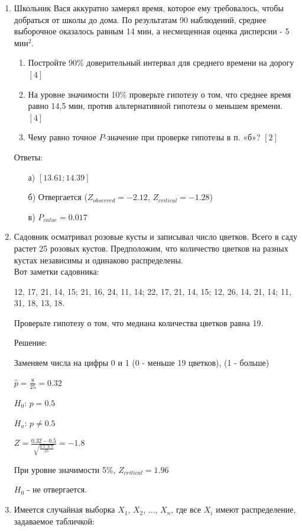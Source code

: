 \documentclass[12pt, a4paper]{article}\usepackage[]{graphicx}\usepackage[]{color}
\begin{document}
\begin{enumerate}
\item Школьник Вася аккуратно замерял время, которое ему требовалось, чтобы добраться от школы до дома. По результатам 90 наблюдений, среднее выборочное оказалось равным 14 мин, а несмещенная оценка дисперсии - 5 мин$^{2}$.
\begin{enumerate}
\item Постройте 90\% доверительный интервал для среднего времени на дорогу $[4]$
\item На уровне значимости 10\% проверьте гипотезу о том, что среднее время равно 14,5 мин, против альтернативной гипотезы о меньшем времени. $[4]$
\item Чему равно точное $P$-значение при проверке гипотезы в п. «б»? $[2]$
\end{enumerate}
Ответы:
\begin{enumerate}
\item[а)] $[13.61;14.39]$
\item[б)]  Отвергается ($Z_{observed}=-2.12$, $Z_{critical}=-1.28$)
\item[в)] $P_{value}=0.017$
\end{enumerate}

\item Садовник осматривал розовые кусты и записывал число цветков. Всего в саду растет 25 розовых кустов. Предположим, что количество цветков на разных кустах независимы и одинаково распределены. \\
Вот заметки садовника:

12, 17, 21, 14, 15; 21, 16, 24, 11, 14; 22, 17, 21, 14, 15; 12, 26, 14, 21, 14; 11, 31, 18, 13, 18.

Проверьте гипотезу о том, что медиана количества цветков равна 19.

Решение:

Заменяем числа на цифры 0 и 1 (0 - меньше 19 цветков), (1 - больше)

$\hat{p}=\frac{8}{25}=0.32$

$H_{0}$: $p=0.5$

$H_{a}$: $p\neq 0.5$

$Z=\frac{0.32-0.5}{\sqrt{\frac{0.5\cdot 0.5}{25}}}=-1.8$

При уровне значимости 5\%, $Z_{critical}=1.96$

$H_{0}$ - не отвергается.

\item Имеется случайная выборка $X_{1}$, $X_{2}$, ..., $X_{n}$, где все $X_{i}$ имеют распределение, задаваемое табличкой:


\end{enumerate}
\end{document}
